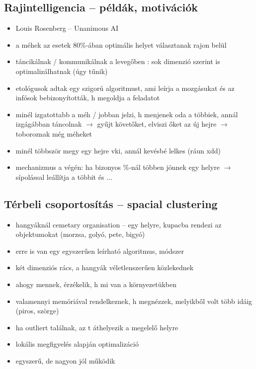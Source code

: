 \documentclass[a4paper, 11pt]{article}
\begin{document}
\subsection{Rajintelligencia -- példák, motivációk}

\begin{itemize}
	\item Louis Rosenberg -- Unanimous AI
	\item a méhek az esetek 80\%-ában optimális helyet választanak rajon belül
	\item táncikálnak / kommunikálnak a levegőben : sok dimenzió szerint is optimalizálhatnak (úgy tűnik)
	\item etológusok adtak egy szigorú algoritmust, ami leírja a mozgásukat és az infósok bebizonyították, h megoldja a feladatot
	\item minél izgatottabb a méh / jobban jelzi, h menjenek oda a többiek, annál izgágábban táncolnak $\to$ gyűjt követőket, elviszi őket az új hejre $\to$ toboroznak még méheket 
	\item minél többször megy egy hejre vki, annál kevésbé lelkes (ráun xdd)
	\item mechanizmus a végén: ha bizonyos \%-nál többen jönnek egy helyre $\to$ sípolással leállítja a többit és ...
\end{itemize}

\subsection{Térbeli csoportosítás -- spacial clustering}

\begin{itemize}
	\item hangyáknál cemetary organisation -- egy helyre, kupacba rendezi az objektumokat (morzsa, golyó, pete, bigyó)
	\item erre is van egy egyszerűen leírható algoritmus, módszer
	\item két dimenziós rács, a hangyák véletlenszerűen közlekednek
	\item ahogy mennek, érzékelik, h mi van a környezetükben
	\item valamennyi memóriával rendelkeznek, h megnézzek, melyikből volt több idáig (piros, szörge)
	\item ha outliert találnak, az t áthelyezik a megelelő helyre
	\item lokális megfigyelés alapján optimalizáció
	\item egyszerű, de nagyon jól működik
\end{itemize}
\end{document}
